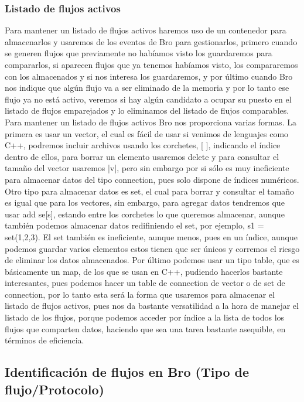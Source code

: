 \subsubsection{Listado de flujos activos}

Para mantener un listado de flujos activos haremos uso de un contenedor para 
almacenarlos y usaremos de los eventos de Bro para gestionarlos, primero cuando 
se generen flujos que previamente no habíamos visto los guardaremos para compararlos, 
si aparecen flujos que ya tenemos habíamos visto, los compararemos con los almacenados 
y si nos interesa los guardaremos, y por último cuando Bro nos indique que algún flujo 
va a ser eliminado de la memoria y por lo tanto ese flujo ya no está activo, veremos 
si hay algún candidato a ocupar su puesto en el listado de flujos emparejados y lo 
eliminamos del listado de flujos comparables.
\intro
Para mantener un listado de flujos activos Bro nos proporciona varias formas. La 
primera es usar un vector, el cual es fácil de usar si venimos de lenguajes como C++, 
podremos incluir archivos usando los corchetes, [ ], indicando el índice dentro 
de ellos, para borrar un elemento usaremos delete y para consultar el tamaño del 
vector usaremos |v|, pero sin embargo por si sólo es muy ineficiente para almacenar 
datos del tipo connection, pues solo dispone de índices numéricos.
\intro
Otro tipo para almacenar datos es set, el cual para borrar y consultar el tamaño 
es igual que para los vectores, sin embargo, para agregar datos tendremos que usar add se[s], 
estando entre los corchetes lo que queremos almacenar, aunque también podemos 
almacenar datos redifiniendo el set, por ejemplo, s1 = set(1,2,3). El set también 
es ineficiente, aunque menos, pues en un índice, aunque podemos guardar varios 
elementos estos tienen que ser únicos y corremos el riesgo de eliminar los datos almacenados.
\intro
Por último podemos usar un tipo table, que es básicamente un map, de los que se 
usan en C++, pudiendo hacerlos bastante interesantes, pues podemos hacer un table 
de connection de vector o de set de connection, por lo tanto esta será la forma 
que usaremos para almacenar el listado de flujos activos, pues nos da bastante 
versatilidad a la hora de manejar el listado de los flujos, porque podemos 
acceder por índice a la lista de todos los flujos que comparten datos, haciendo 
que sea una tarea bastante asequible, en términos de eficiencia.

\subsection{Identificación de flujos en Bro (Tipo de flujo/Protocolo)}

